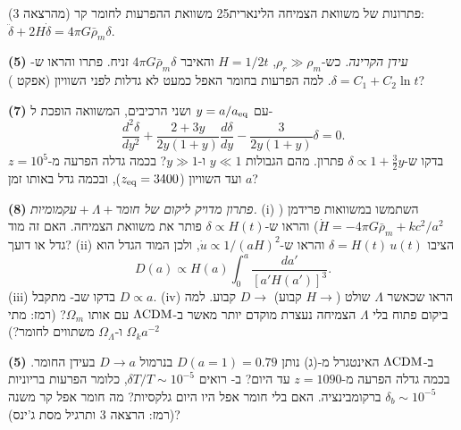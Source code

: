 \documentclass[11pt,a4paper]{article}
\begin{document}

\begin{question}{פתרונות של משוואת הצמיחה הלינארית}{25}
משוואת ההפרעות לחומר קר (מהרצאה 3): $\ddot\delta+2H\dot\delta=4\pi G\bar\rho_m\delta$.
\begin{parts}
\item \textbf{(5)} \emph{עידן הקרינה.} כש-$\rho_r\gg\rho_m$, $H=1/2t$ והאיבר $4\pi G\bar\rho_m\delta$ זניח. פתרו והראו ש-$\delta=C_1+C_2\ln t$. למה הפרעות בחומר האפל כמעט לא גדלות לפני השוויון (אפקט )?
\item \textbf{(7)} עם $y=a/a_{\rm eq}$ ושני הרכיבים, המשוואה הופכת ל-
\[\frac{d^2\delta}{dy^2}+\frac{2+3y}{2y(1+y)}\frac{d\delta}{dy}-\frac{3}{2y(1+y)}\delta=0.\]
בדקו ש-$\delta\propto1+\tfrac32y$ פתרון. מהם הגבולות $y\ll1$ ו-$y\gg1$? בכמה גדלה הפרעה מ-$z=10^5$ ועד השוויון ($z_{\rm eq}=3400$), ובכמה גדל באותו זמן $a$?
\item \textbf{(8)} \emph{פתרון מדויק ליקום של חומר${}+\Lambda+{}$עקמומיות.} (i) השתמשו במשוואות פרידמן ($\dot H=-4\pi G\bar\rho_m+kc^2/a^2$) והראו ש-$\delta\propto H(t)$ פותר את משוואת הצמיחה. האם זה מוד גדל או דועך? (ii) הציבו $\delta=H(t)\,u(t)$ והראו ש-$\dot u\propto1/(aH)^2$, ולכן המוד הגדל הוא
\[D(a)\propto H(a)\int_0^a\frac{da'}{[a'H(a')]^3}.\]
(iii) בדקו שב- מתקבל $D\propto a$. (iv) הראו שכאשר $\Lambda$ שולט ($H\to$ קבוע) $D\to$ קבוע. למה ביקום פתוח בלי $\Lambda$ הצמיחה נעצרת מוקדם יותר מאשר ב-$\Lambda\mathrm{CDM}$ עם אותו $\Omega_m$? (רמז: מתי $\Omega_k a^{-2}$ ו-$\Omega_\Lambda$ משתווים לחומר?)
\item \textbf{(5)} ב-$\Lambda\mathrm{CDM}$ האינטגרל מ-(ג) נותן $D(a{=}1)=0.79$ בנרמול $D\to a$ בעידן החומר. בכמה גדלה הפרעה מ-$z=1090$ עד היום? ב- רואים $\delta T/T\sim10^{-5}$, כלומר הפרעות בריוניות $\delta_b\sim10^{-5}$ ברקומבינציה. האם בלי חומר אפל היו היום גלקסיות? מה חומר אפל קר משנה (רמז: הרצאה 3 ותרגיל מסת ג'ינס)?
\end{parts}
\end{question}
\end{document}
